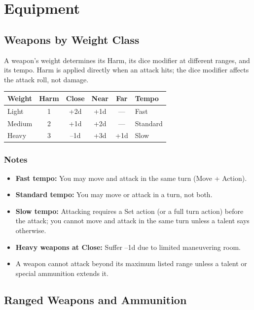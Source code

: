 
\section{Equipment}

\subsection{Weapons by Weight Class}

A weapon's weight determines its Harm, its dice modifier at different ranges, and its tempo. Harm is applied directly when an attack hits; the dice modifier affects the attack roll, not damage.

\begin{tabular}{@{}lccccl@{}}
\toprule
\textbf{Weight} & \textbf{Harm} & \textbf{Close} & \textbf{Near} & \textbf{Far} & \textbf{Tempo} \\
\midrule
Light   & 1 & +2d & +1d & --- & Fast \\
Medium  & 2 & +1d & +2d & --- & Standard \\
Heavy   & 3 & --1d & +3d & +1d & Slow \\
\bottomrule
\end{tabular}

\subsubsection{Notes}
\begin{itemize}
  \item \textbf{Fast tempo:} You may move and attack in the same turn (Move + Action).
  \item \textbf{Standard tempo:} You may move or attack in a turn, not both.
  \item \textbf{Slow tempo:} Attacking requires a Set action (or a full turn action) before the attack; you cannot move and attack in the same turn unless a talent says otherwise.
  \item \textbf{Heavy weapons at Close:} Suffer --1d due to limited maneuvering room.
  \item A weapon cannot attack beyond its maximum listed range unless a talent or special ammunition extends it.
\end{itemize}

\subsection{Ranged Weapons and Ammunition}

